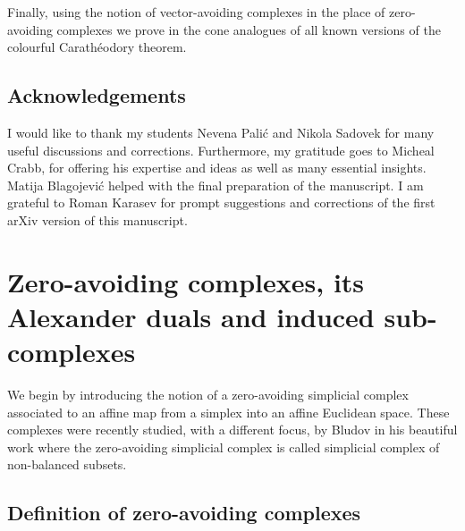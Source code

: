 \documentclass[a4paper,11pt,reqno, english]{amsart}
\theoremstyle{definition}
\theoremstyle{remark}
\begin{document}
\medskip
Finally, using the notion of vector-avoiding complexes in the place of zero-avoiding complexes we prove in \cite{BlagojevicKarasev2025} the cone analogues of all known versions of the colourful Carath\'eodory theorem.

\subsection*{Acknowledgements}

I would like to thank my students Nevena Pali\'c and Nikola Sadovek for many useful discussions and corrections. Furthermore, my gratitude goes to Micheal Crabb, for offering his expertise and ideas as well as many essential insights.
Matija Blagojevi\'c helped with the final preparation of the manuscript.
I am grateful to Roman Karasev for prompt suggestions and corrections of the first arXiv version of this manuscript.



\bigskip
\section{Zero-avoiding complexes, its Alexander duals and induced sub-complexes}
\label{sec:ZeroAvoidingComplexesAlexanderDualsInducedSubcomplexes}
\bigskip


We begin by introducing the notion of a zero-avoiding simplicial complex associated to an affine map from a simplex into an affine Euclidean space.
These complexes were recently studied, with a different focus, by Bludov in his beautiful work \cite{Bludov2025} where the zero-avoiding simplicial complex is called simplicial complex of non-balanced subsets.

\medskip
\subsection{Definition of zero-avoiding complexes}
\label{subsec : Definition of zero-avoiding complexes}
\end{document}
